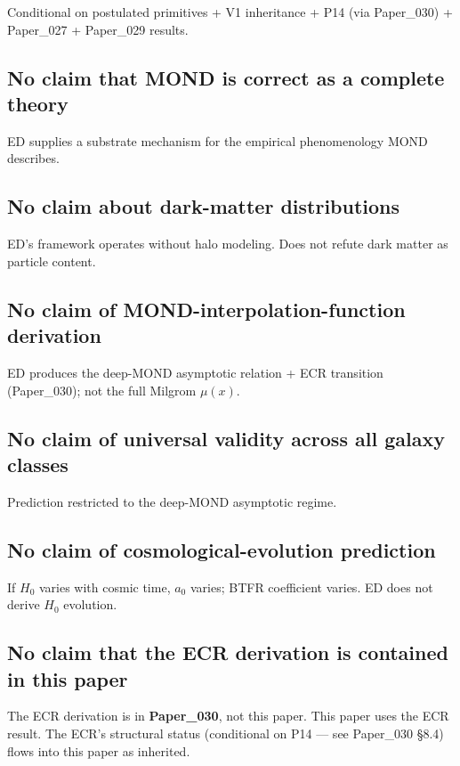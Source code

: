 \documentclass[11pt,a4paper]{article}
\begin{document}
Conditional on postulated primitives + V1 inheritance + P14 (via Paper\_030) + Paper\_027 + Paper\_029 results.

\subsection{No claim that MOND is correct as a complete theory}

ED supplies a substrate mechanism for the empirical phenomenology MOND describes.

\subsection{No claim about dark-matter distributions}

ED's framework operates without halo modeling. Does not refute dark matter as particle content.

\subsection{No claim of MOND-interpolation-function derivation}

ED produces the deep-MOND asymptotic relation + ECR transition (Paper\_030); not the full Milgrom $\mu(x)$.

\subsection{No claim of universal validity across all galaxy classes}

Prediction restricted to the deep-MOND asymptotic regime.

\subsection{No claim of cosmological-evolution prediction}

If $H_0$ varies with cosmic time, $a_0$ varies; BTFR coefficient varies. ED does not derive $H_0$ evolution.

\subsection{No claim that the ECR derivation is contained in this paper}

The ECR derivation is in \textbf{Paper\_030}, not this paper. This paper uses the ECR result. The ECR's structural status (conditional on P14 --- see Paper\_030 \S8.4) flows into this paper as inherited.
\end{document}

